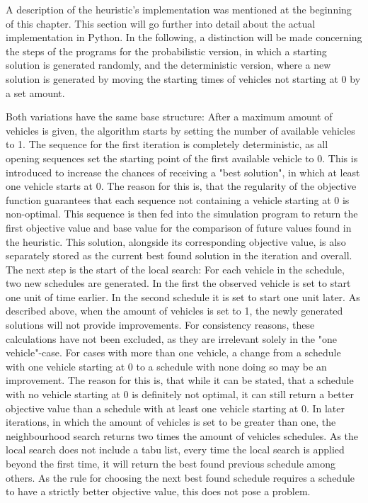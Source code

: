 A description of the heuristic's implementation was mentioned at the beginning of this chapter. This section will go further into detail about
the actual implementation in Python. In the following, a distinction will be made concerning the steps of the programs for the probabilistic version,
in which a starting solution is generated randomly, and the deterministic version, where a new solution is generated by moving the starting times
of vehicles not starting at 0 by a set amount.

Both variations have the same base structure: After a maximum amount of vehicles is given, the algorithm starts by setting the number of available
vehicles to 1. The sequence for the first iteration is completely deterministic, as all opening sequences set the starting point of the first available
vehicle to 0. This is introduced to increase the chances of receiving a "best solution", in which at least one vehicle starts at 0. The reason for this is,
that the regularity of the objective function guarantees that each sequence not containing a vehicle starting at 0 is non-optimal.
This sequence is then fed into the simulation program to return the first objective value and base value for the comparison of future values found in the heuristic. This solution, alongside its corresponding objective
value, is also separately stored as the current best found solution in the iteration and overall. The next step is the start of the local search:
For each vehicle in the schedule, two new schedules are generated. In the first the observed vehicle is set to start one unit of time earlier. In
the second schedule it is set to start one unit later. As described above, when the amount of vehicles is set to 1, the newly generated solutions
will not provide improvements. For consistency reasons, these calculations have not been excluded, as they are irrelevant solely in the "one vehicle"-case.
For cases with more than one vehicle, a change from a schedule with one vehicle starting at 0 to a schedule with none doing so may be an improvement.
The reason for this is, that while it can be stated, that a schedule with no vehicle starting at 0 is definitely not optimal, it can still return a better
objective value than a schedule with at least one vehicle starting at 0. In later iterations, in which the amount of vehicles is set to be greater than
one, the neighbourhood search returns two times the amount of vehicles schedules. As the local search does not include a tabu list, every time the
local search is applied beyond the first time, it will return the best found previous schedule among others. As the rule for choosing the next best
found schedule requires a schedule to have a strictly better objective value, this does not pose a problem.


